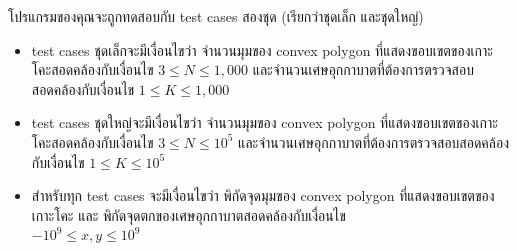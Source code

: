 โปรแกรมของคุณจะถูกทดสอบกับ test cases สองชุด (เรียกว่าชุดเล็ก และชุดใหญ่)
\begin{itemize}
\item test cases ชุดเล็กจะมีเงื่อนไขว่า จำนวนมุมของ convex polygon 
    ที่แสดงขอบเขตของเกาะโคะสอดคล้องกับเงื่อนไข $3 \leq N \leq 1,\!000$ 
    และจำนวนเศษอุกกาบาตที่ต้องการตรวจสอบสอดคล้องกับเงื่อนไข $1 \leq K \leq 1,\!000$
\item test cases ชุดใหญ่จะมีเงื่อนไขว่า จำนวนมุมของ convex polygon 
    ที่แสดงขอบเขตของเกาะโคะสอดคล้องกับเงื่อนไข $3 \leq N \leq 10^5$ 
    และจำนวนเศษอุกกาบาตที่ต้องการตรวจสอบสอดคล้องกับเงื่อนไข $1 \leq K \leq 10^5$
\item สำหรับทุก test cases จะมีเงื่อนไขว่า พิกัดจุดมุมของ convex polygon 
    ที่แสดงขอบเขตของเกาะโคะ และ พิกัดจุดตกของเศษอุกกาบาตสอดคล้องกับเงื่อนไข \\
    $-10^9 \leq x,y \leq 10^9$
\end{itemize}

